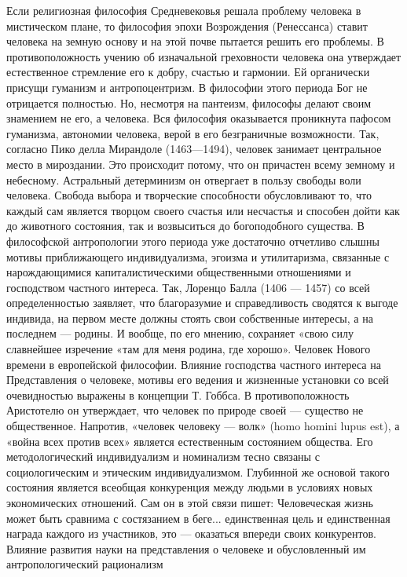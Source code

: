 \documentclass[12pt]{article}
\begin{document}
Если религиозная философия Средневековья решала проблему человека в мистическом плане, то философия
эпохи Возрождения (Ренессанса) ставит человека на земную основу и на этой почве пытается решить его
проблемы. В противоположность учению об изначальной греховности человека она утверждает естественное
стремление  его  к  добру,  счастью  и  гармонии.  Ей  органически  присущи  гуманизм  и  антропоцентризм.  В
философии этого периода Бог не отрицается полностью. Но, несмотря на пантеизм, философы делают своим
знамением  не  его,  а  человека.  Вся  философия  оказывается  проникнута  пафосом  гуманизма,  автономии
человека, верой в его безграничные возможности.
Так, согласно Пико делла Мирандоле (1463—1494), человек занимает центральное место в мироздании. Это
происходит потому, что он причастен всему земному и небесному. Астральный детерминизм он отвергает в
пользу свободы воли человека. Свобода выбора и творческие способности обусловливают то, что каждый сам
является  творцом  своего  счастья  или  несчастья  и  способен  дойти  как  до  животного  состояния,  так  и
возвыситься до богоподобного существа.
В  философской  антропологии  этого  периода  уже  достаточно  отчетливо  слышны  мотивы  приближающего
индивидуализма, эгоизма и утилитаризма, связанные с нарождающимися капиталистическими общественными
отношениями и господством частного интереса. Так, Лоренцо Балла (1406 — 1457) со всей определенностью
заявляет, что благоразумие и справедливость сводятся к выгоде индивида, на первом месте должны стоять свои
собственные интересы, а на последнем — родины. И вообще, по его мнению, сохраняет «свою силу славнейшее
изречение «там для меня родина, где хорошо».
Человек Нового времени в европейской философии.
Влияние  господства  частного  интереса  на  Представления  о  человеке,  мотивы  его  ведения  и  жизненные
установки  со всей  очевидностью  выражены в  концепции  Т.  Гоббса.  В противоположность  Аристотелю он
утверждает, что человек по природе своей — существо не общественное. Напротив, «человек человеку — волк»
(homo  homini  lupus  est),  а  «война  всех  против  всех»  является  естественным  состоянием  общества.  Его
методологический  индивидуализм  и  номинализм  тесно  связаны  с  социологическим  и  этическим
индивидуализмом. Глубинной же основой такого состояния является всеобщая конкуренция между людьми в
условиях новых экономических отношений. Сам он в этой связи пишет:
Человеческая жизнь может быть сравнима с состязанием в беге... единственная цель и единственная награда
каждого из участников, это — оказаться впереди своих конкурентов.
Влияние развития науки на представления о человеке и обусловленный им антропологический рационализм
\end{document}
